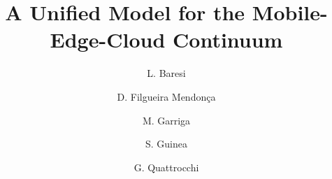 \documentclass[manuscript, screen]{acmart} %
\begin{document}
\title{A Unified Model for the Mobile-Edge-Cloud Continuum} 

\author{L. Baresi}
\author{D. Filgueira Mendon\c{c}a}
\author{M. Garriga}
\author{S. Guinea}
\author{G. Quattrocchi}
\newcommand\gio[1]{\textcolor{red}{\textbf{GQ: }#1}}
\renewcommand\shortauthors{Baresi, L. et al}
\renewcommand{\texttt}[1]{\textit{#1}} 
\begin{abstract}

\end{abstract}
\end{document}
